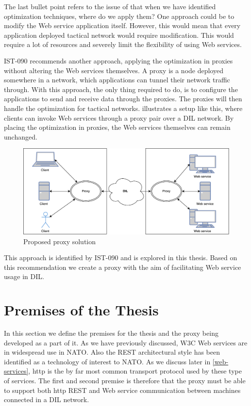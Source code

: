 The last bullet point refers to the issue of that when we have identified
optimization techniques, where do we apply them? One approach could be to modify
the Web service application itself. However, this would mean that every
application deployed tactical network would require modification. This would
require a lot of resources and severely limit the flexibility of using Web
services.

IST-090 recommends another approach, applying the optimization in proxies
without altering the Web services themselves\cite{ist-090}. A proxy is a node
deployed somewhere in a network, which applications can tunnel their network
traffic through. With this approach, the only thing required to do, is to
configure the applications to send and receive data through the proxies. The
proxies will then handle the optimization for tactical networks.
 illustrates a setup like this, where
clients can invoke Web services through a proxy pair over a DIL network. By
placing the optimization in proxies, the Web services themselves can remain
unchanged.

\begin{figure}[h] \includegraphics[scale=0.5]{images/proposed_solution.pdf}
\caption{Proposed proxy solution} \label{figure-proposed-proxy-solution}
\end{figure}

This approach is identified by IST-090 and is explored in this thesis. Based on
this recommendation we create a proxy with the aim of facilitating Web service
usage in DIL.


\section{Premises of the Thesis}

In this section we define the premises for the thesis and the proxy being
developed as a part of it. As we have previously discussed, W3C Web
services are in widespread use in NATO. Also the REST architectural style has
been identified as a technology of interest to NATO. As we discuss later in
\cref{web-services}, \gls{http} is the by far most common transport protocol
used by these type of services. The first and second premise is therefore that
the proxy must be able to support both \gls{http} REST and Web service communication
between machines connected in a DIL network.

